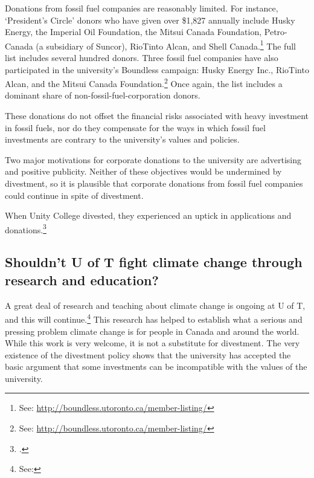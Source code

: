 Donations from fossil fuel companies are reasonably limited. 
For instance, `President's Circle' donors who have given over \$1,827 annually include Husky Energy, the Imperial Oil Foundation, the Mitsui Canada Foundation, Petro-Canada (a subsidiary of Suncor), RioTinto Alcan, and Shell Canada.\footnote{See: \url{http://boundless.utoronto.ca/member-listing/}}
The full list includes several hundred donors.
Three fossil fuel companies have also participated in the university's Boundless campaign: Husky Energy Inc., RioTinto Alcan, and the Mitsui Canada Foundation.\footnote{See: \url{http://boundless.utoronto.ca/member-listing/}}
Once again, the list includes a dominant share of non-fossil-fuel-corporation donors.



These donations do not offset the financial risks associated with heavy investment in fossil fuels, nor do they compensate for the ways in which fossil fuel investments are contrary to the university's values and policies.



Two major motivations for corporate donations to the university are advertising and positive publicity.
Neither of these objectives would be undermined by divestment, so it is plausible that corporate donations from fossil fuel companies could continue in spite of divestment.



When Unity College divested, they experienced an uptick in applications and donations.\footcite[][p. 4]{CaseForDivestment}



	\subsection{Shouldn't U of T fight climate change through research and education?}
	\label{ResearchEducation}



A great deal of research and teaching about climate change is ongoing at U of T, and this will continue.\footnote{See: }
This research has helped to establish what a serious and pressing problem climate change is for people in Canada and around the world.
While this work is very welcome, it is not a substitute for divestment.
The very existence of the divestment policy shows that the university has accepted the basic argument that some investments can be incompatible with the values of the university.



